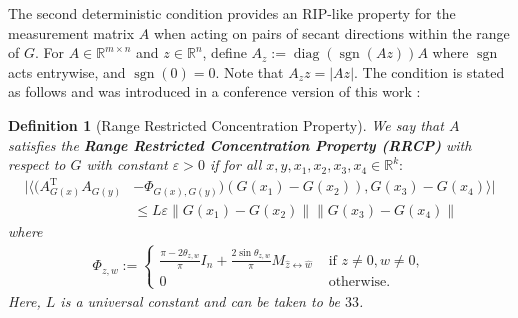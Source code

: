 \documentclass[11pt]{article}
\renewcommand{\epsilon}{\varepsilon}
\newcommand{\R}{\mathbb{R}}
\newcommand{\E}{\operatorname{\mathbb{E}}}
\newcommand{\sgn}{\operatorname{sgn}}
\newcommand{\diag}{\operatorname{diag}}
\newcommand{\G}{G}
\renewcommand{\top}{{\mathrm{T}}}
\newcommand{\red}[1]{{\color{red} {#1}}}
\newcommand{\blue}[1]{{\color{blue} {#1}}}
\newtheorem{lem}{Lemma}
\newtheorem{defn}[thm]{Definition}
\theoremstyle{remark}
\begin{document}
The second deterministic condition provides an RIP-like property for the measurement matrix $A$ when acting on pairs of secant directions within the range of $\G$. For $A \in \R^{m \times n}$ and $z \in \R^n$, define $A_z := \diag(\sgn(Az))A$ where $\sgn$ acts entrywise, and $\sgn(0) = 0$. Note that $A_zz = |Az|$. The condition is stated as follows and was introduced in a conference version of this work \cite{HLV18}: 

\begin{defn}[Range Restricted Concentration Property] \label{rrcp_def} We say that $A$ satisfies the \textbf{Range Restricted Concentration Property (RRCP)} with respect to $\G$ with constant $\epsilon > 0$ if for all $x,y,x_1,x_2,x_3,x_4 \in \R^k:$ 
\begin{align}
    |\langle (A_{\G(x)}^\top A_{\G(y)} & - \Phi_{\G(x),\G(y)})(\G(x_1) - \G(x_2)), \G(x_3)-\G(x_4)\rangle | \nonumber \\
    & \leqslant L\epsilon\|\G(x_1) - \G(x_2)\|\|\G(x_3)-\G(x_4)\| \nonumber
\end{align} where \begin{align}
    \Phi_{z,w}:=  \begin{cases} \frac{\pi - 2\theta_{z,w}}{\pi}I_n + \frac{2\sin \theta_{z,w}}{\pi} M_{\hat{z} \leftrightarrow \hat{w}}  & \text{ if } z\neq 0, w \neq 0, \\
    0 & \text{ otherwise.}
\end{cases} \label{Phi_def}
\end{align} Here, $L$ is a universal constant and can be taken to be $33$.
\end{defn}

\end{document}
